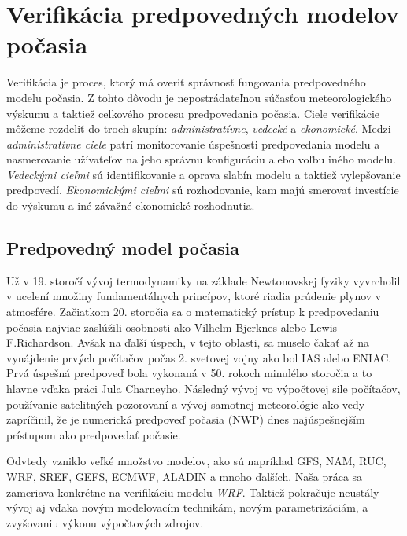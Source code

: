 \chapter{Verifikácia predpovedných modelov počasia}

Verifikácia je proces, ktorý má overiť správnosť fungovania predpovedného modelu počasia. Z tohto dôvodu je nepostrádateľnou súčasťou meteorologického výskumu a taktiež celkového procesu predpovedania počasia. \cite{MET:MET52}
Ciele verifikácie môžeme rozdeliť do troch skupín: \textit{administratívne}, \textit{vedecké} a \textit{ekonomické}.
Medzi \textit{administratívne ciele} patrí monitorovanie úspešnosti predpovedania modelu a nasmerovanie užívateľov na jeho správnu konfiguráciu alebo voľbu iného modelu. \textit{Vedeckými cieľmi} sú identifikovanie a oprava slabín modelu a taktiež vylepšovanie predpovedí. \textit{Ekonomickými cieľmi} sú rozhodovanie, kam majú smerovať investície do výskumu a iné závažné ekonomické rozhodnutia. \cite{IntroToVerif}


\section{Predpovedný model počasia}

Už v 19. storočí vývoj termodynamiky na základe Newtonovskej fyziky vyvrcholil v ucelení množiny fundamentálnych princípov, ktoré riadia prúdenie plynov v atmosfére. 
Začiatkom 20. storočia sa o matematický prístup k predpovedaniu počasia najviac zaslúžili osobnosti ako Vilhelm Bjerknes alebo Lewis F.Richardson. Avšak na ďalší úspech, v tejto oblasti, sa muselo čakať až na vynájdenie prvých počítačov počas 2. svetovej vojny ako bol IAS alebo ENIAC. \cite{Origins}
Prvá úspešná predpoveď bola vykonaná v 50. rokoch minulého storočia a to hlavne vďaka práci Jula Charneyho.
Následný vývoj vo výpočtovej sile počítačov, používanie satelitných pozorovaní a vývoj samotnej meteorológie ako vedy zapríčinil, že je numerická predpoveď počasia (NWP) dnes najúspešnejším prístupom ako predpovedať počasie.  \cite{Golding}

Odvtedy vzniklo veľké množstvo modelov, ako sú napríklad GFS, NAM, RUC, WRF, SREF, GEFS, ECMWF, ALADIN a mnoho ďalších. Naša práca sa zameriava konkrétne na verifikáciu modelu \textit{WRF}. Taktiež pokračuje neustály vývoj aj vďaka novým modelovacím technikám, novým parametrizáciám, a zvyšovaniu výkonu výpočtových zdrojov.

